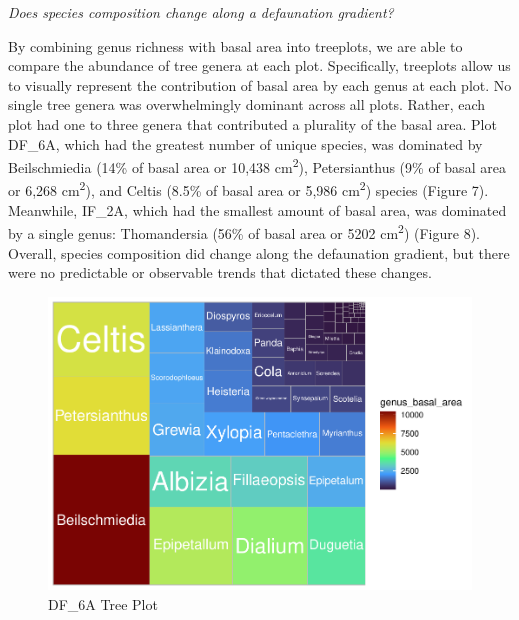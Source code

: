 \documentclass[
  12pt,
]{article}
\begin{document}
\emph{Does species composition change along a defaunation gradient?}

By combining genus richness with basal area into treeplots, we are able
to compare the abundance of tree genera at each plot. Specifically,
treeplots allow us to visually represent the contribution of basal area
by each genus at each plot. No single tree genera was overwhelmingly
dominant across all plots. Rather, each plot had one to three genera
that contributed a plurality of the basal area. Plot DF\_6A, which had
the greatest number of unique species, was dominated by Beilschmiedia
(14\% of basal area or 10,438 cm\textsuperscript{2}), Petersianthus (9\%
of basal area or 6,268 cm\textsuperscript{2}), and Celtis (8.5\% of
basal area or 5,986 cm\textsuperscript{2}) species (Figure 7).
Meanwhile, IF\_2A, which had the smallest amount of basal area, was
dominated by a single genus: Thomandersia (56\% of basal area or 5202
cm\textsuperscript{2}) (Figure 8). Overall, species composition did
change along the defaunation gradient, but there were no predictable or
observable trends that dictated these changes.

\begin{figure}
\centering
\includegraphics{GoldenGriffithsKnierMalinowski_ENV872_Project_files/figure-latex/unnamed-chunk-10-1.pdf}
\caption{DF\_6A Tree Plot}
\end{figure}
\end{document}

